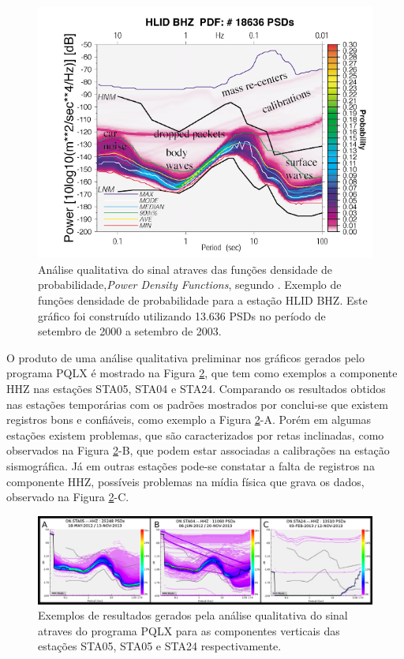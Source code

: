 \begin{figure}[!ht]
\centering
\includegraphics[scale=0.6]{Figs/mcnamura_buland.png}
\caption[Análise qualitativa do sinal atraves das funções densidade de probabilidade]{Análise qualitativa do sinal atraves das funções densidade de probabilidade,\textit{Power Density Functions}, segundo \cite{McNamara_Buland_2004}. Exemplo de funções densidade de probabilidade para a estação HLID BHZ. Este gráfico foi construído utilizando 13.636 PSDs no período de setembro de 2000 a setembro de 2003.}
\label{PQLX}
\end{figure}

O produto de uma análise qualitativa preliminar nos gráficos gerados pelo programa PQLX é mostrado na Figura \ref{PQLX_results}, que tem como exemplos a componente HHZ nas estações STA05, STA04 e STA24. Comparando os resultados obtidos nas estações temporárias com os padrões mostrados por \cite{McNamara_Buland_2004} conclui-se que existem registros bons e confiáveis, como exemplo a Figura \ref{PQLX_results}-A. Porém em algumas estações existem problemas, que são caracterizados por retas inclinadas, como observados na Figura \ref{PQLX_results}-B, que podem estar associadas a calibrações na estação sismográfica. Já em outras estações pode-se constatar a falta de registros na componente HHZ, possíveis problemas na mídia física que grava os dados, observado na Figura \ref{PQLX_results}-C.

\begin{figure}[!ht]
\centering
\includegraphics[scale=0.3]{Figs/pqlx_results.png}
\caption{Exemplos de resultados gerados pela análise qualitativa do sinal atraves do programa PQLX para as componentes verticais das estações STA05, STA05 e STA24 respectivamente.}
\label{PQLX_results}
\end{figure}

